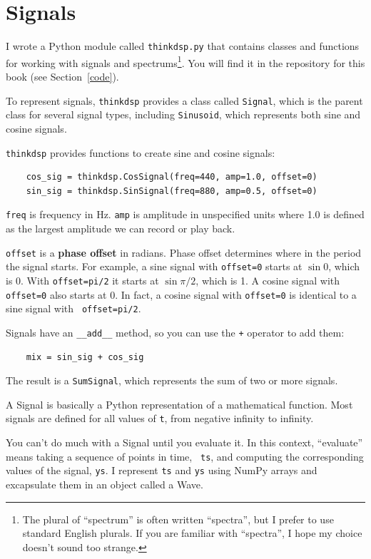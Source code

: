 \documentclass[12pt]{book}
\begin{document}
\section{Signals}

I wrote a Python module called {\tt thinkdsp.py} that contains classes
and functions for working with signals and spectrums\footnote{The
plural of ``spectrum'' is often written ``spectra'', but I prefer
to use standard English plurals.  If you are familiar with ``spectra'',
I hope my choice doesn't sound too strange.}.  You
will find it in the repository for this book (see Section~\ref{code}).

To represent signals, {\tt thinkdsp} provides a class called
{\tt Signal}, which is the parent class for several signal types,
including {\tt Sinusoid}, which represents both sine and cosine
signals.

{\tt thinkdsp} provides functions to create sine and cosine signals:

\begin{verbatim}
    cos_sig = thinkdsp.CosSignal(freq=440, amp=1.0, offset=0)
    sin_sig = thinkdsp.SinSignal(freq=880, amp=0.5, offset=0)
\end{verbatim}

{\tt freq} is frequency in Hz.  {\tt amp} is amplitude in unspecified
units where 1.0 is defined as the largest amplitude we can record or
play back.

{\tt offset} is a {\bf phase offset} in radians.  Phase offset
determines where in the period the signal starts.  For example, a
sine signal with {\tt offset=0} starts at $\sin 0$, which is 0.
With {\tt offset=pi/2} it starts at $\sin \pi/2$, which is 1.  A cosine
signal with {\tt offset=0} also starts at 0.  In fact, a cosine signal
with {\tt offset=0} is identical to a sine signal with {\tt
  offset=pi/2}.

Signals have an \verb"__add__" method, so you can use the {\tt +}
operator to add them:

\begin{verbatim}
    mix = sin_sig + cos_sig
\end{verbatim}

The result is a {\tt SumSignal}, which represents the sum of two
or more signals.

A Signal is basically a Python representation of a mathematical
function.  Most signals are defined for all values of {\tt t},
from negative infinity to infinity.

You can't do much with a Signal until you evaluate it.  In this
context, ``evaluate'' means taking a sequence of points in time, {\tt
  ts}, and computing the corresponding values of the signal, {\tt ys}.
I represent {\tt ts} and {\tt ys} using NumPy arrays and excapsulate
them in an object called a Wave.
\end{document}
